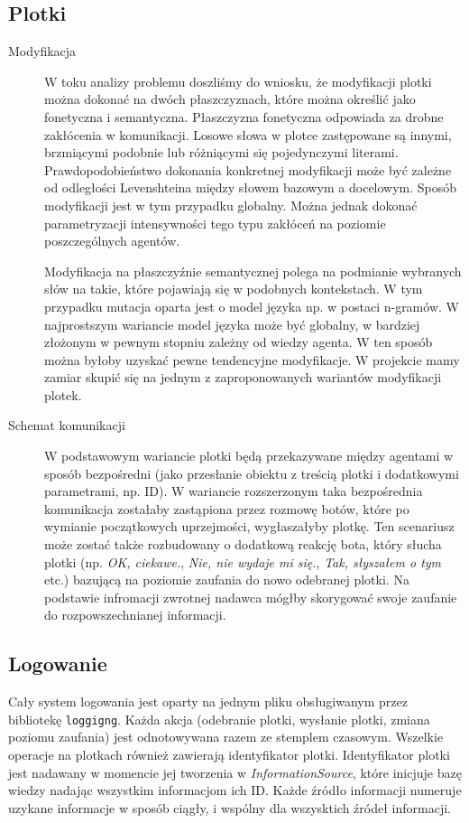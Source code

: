 \documentclass{article}
\begin{document}
	\subsection{Plotki}
	\begin{description}
		\item[Modyfikacja]
		W toku analizy problemu doszliśmy do wniosku, że modyfikacji plotki można dokonać na dwóch płaszczyznach, które można określić jako fonetyczna i semantyczna. Płaszczyzna fonetyczna odpowiada za drobne zakłócenia w komunikacji. Losowe słowa w plotce zastępowane są innymi, brzmiącymi podobnie lub różniącymi się pojedynczymi literami. Prawdopodobieństwo dokonania konkretnej modyfikacji może być zależne od odległości Levenshteina między słowem bazowym a docelowym. Sposób modyfikacji jest w tym przypadku globalny. Można jednak dokonać parametryzacji intensywności tego typu zakłóceń na poziomie poszczególnych agentów.
	
		Modyfikacja na płaszczyźnie semantycznej polega na podmianie wybranych słów na takie, które pojawiają się w podobnych kontekstach. W tym przypadku mutacja oparta jest o model języka np. w postaci n-gramów. W najprostszym wariancie model języka może być globalny, w bardziej złożonym w pewnym stopniu zależny od wiedzy agenta. W ten sposób można byłoby uzyskać pewne tendencyjne modyfikacje.
		W projekcie mamy zamiar skupić się na jednym z zaproponowanych wariantów modyfikacji plotek.
		\item[Schemat komunikacji]
	W podstawowym wariancie plotki będą przekazywane między agentami w sposób bezpośredni (jako przesłanie obiektu z treścią plotki i dodatkowymi parametrami, np. ID). W wariancie rozszerzonym taka bezpośrednia komunikacja zostałaby zastąpiona przez rozmowę botów, które po wymianie początkowych uprzejmości, wygłaszałyby plotkę. Ten scenariusz może zostać także rozbudowany o dodatkową reakcję bota, który słucha plotki (np. \textit{OK, ciekawe.}, \textit{Nie, nie wydaje mi się.}, \textit{Tak, słyszałem o tym} etc.) bazującą na poziomie zaufania do nowo odebranej plotki. Na podstawie infromacji zwrotnej nadawca mógłby skorygować swoje zaufanie do rozpowszechnianej informacji.
	\end{description}

	\subsection{Logowanie}
	Cały system logowania jest oparty na jednym pliku obsługiwanym przez bibliotekę \texttt{loggigng}. Każda akcja (odebranie plotki, wysłanie plotki, zmiana poziomu zaufania) jest odnotowywana razem ze stemplem czasowym. Wszelkie operacje na plotkach również zawierają identyfikator plotki. Identyfikator plotki jest nadawany w momencie jej tworzenia w \textit{InformationSource}, które inicjuje bazę wiedzy nadając wszystkim informacjom ich ID. Każde źródło informacji numeruje uzykane informacje w sposób ciągły, i wspólny dla wszysktich źródeł informacji.
\end{document}
